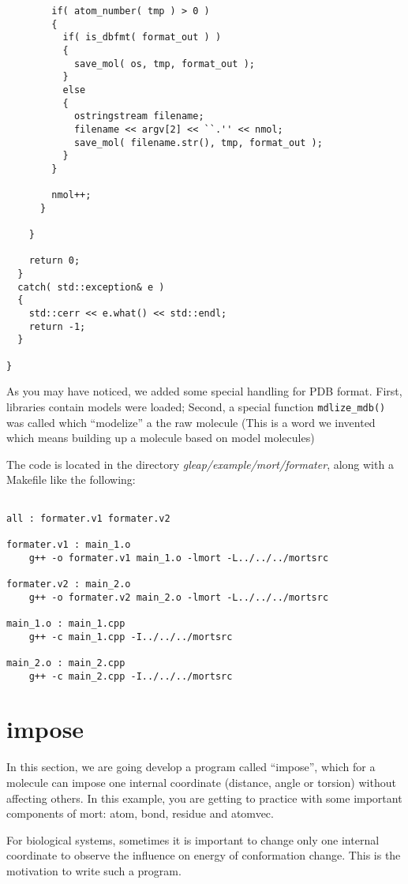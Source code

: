 \documentclass[letterpaper]{book}
\begin{document}
\begin{lstlisting}
        if( atom_number( tmp ) > 0 )
        {
          if( is_dbfmt( format_out ) )
          {
            save_mol( os, tmp, format_out );
          }
          else
          {
            ostringstream filename;
            filename << argv[2] << ``.'' << nmol;
            save_mol( filename.str(), tmp, format_out );
          }
        }

        nmol++;
      }

    }

    return 0;
  }
  catch( std::exception& e )
  {
    std::cerr << e.what() << std::endl;
    return -1;
  }

}

\end{lstlisting}

As you may have noticed, we added some special handling for PDB format. First, libraries contain
models were loaded; Second, a special function \lstinline$mdlize_mdb()$ was called which ``modelize''
a the raw molecule (This is a word we invented which means building up a molecule based on model
molecules)

The code is located in the directory {\it gleap/example/mort/formater}, along with a Makefile
like the following:

\begin{lstlisting}

all : formater.v1 formater.v2

formater.v1 : main_1.o
	g++ -o formater.v1 main_1.o -lmort -L../../../mortsrc

formater.v2 : main_2.o
	g++ -o formater.v2 main_2.o -lmort -L../../../mortsrc

main_1.o : main_1.cpp
	g++ -c main_1.cpp -I../../../mortsrc

main_2.o : main_2.cpp
	g++ -c main_2.cpp -I../../../mortsrc

\end{lstlisting}



\section{impose}
  In this section, we are going develop a program called ``impose'', which for a molecule can 
impose one internal coordinate (distance, angle or torsion) without affecting others. In this 
example, you are getting to practice with some important components of mort: atom, bond, residue
and atomvec.

  For biological systems, sometimes it is important to change only one internal coordinate to
observe the influence on energy of conformation change. This is the motivation to write such
a program.
  
\end{document}
